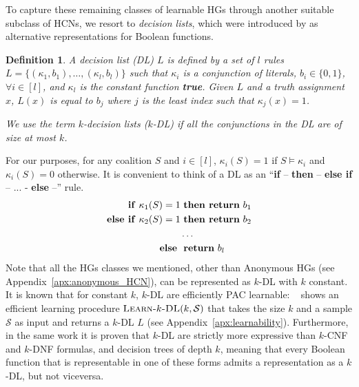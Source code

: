 \documentclass[letterpaper]{article} %
\newtheorem{definition}[theorem]{Definition}
\newcommand{\sample}{\ensuremath{\mathcal{S}}}
\newcommand{\learnkDL}{\textsc{Learn-}k\textsc{-DL}}
\begin{document}
To capture these remaining classes of learnable HGs through another suitable subclass of HCNs, we resort to \emph{decision lists}, which were introduced by \citet{Rivest87} as alternative representations for Boolean functions.
\begin{definition}
A \emph{decision list (DL)} $L$ is defined by a set of $l$ rules $L=\{(\kappa_1, b_1), \ldots, (\kappa_l, b_l)\}$ such that $\kappa_i$ is a conjunction of literals, $b_i \in \{0,1\}$, $\forall i\in [l]$, and $\kappa_l$ is the constant function \textbf{true}. Given $L$ and a truth assignment $x$, $L(x)$ is equal to $b_j$ where $j$ is the least index such that $\kappa_j(x)=1$.

We use the term $k$-decision lists ($k$-DL) if all the conjunctions in the DL are of size at most $k$.
\end{definition}
%
For our purposes, for any coalition $S$ and $i\in [l]$, $\kappa_i(S)=1$ if $S\models \kappa_i$ and $\kappa_i(S)=0$ otherwise. It is convenient to think of a DL as an ``\textbf{if} -- \textbf{then} -- \textbf{else if} -- ... - \textbf{else} --'' rule.
\begin{align*}
    \text{\textbf{if} } \kappa_1(S)=1 &\text{ \textbf{then return} } b_1\\
    \text{\textbf{else if} } \kappa_2(S)=1 &\text{ \textbf{then return} } b_2\\
    &\ldots\\
    \text{\textbf{else} } &\text{ \textbf{return} } b_l
\end{align*}
Note that all the HGs classes we mentioned, other than Anonymous HGs 
(see Appendix~\ref{apx:anonymous_HCN}),
can be represented as $k$-DL with $k$ constant.
%
It is known that for constant $k$, $k$-DL 
are efficiently PAC learnable: ~\citet{Rivest87} shows an efficient learning procedure $\learnkDL(k,\sample)$ that takes the size $k$ and a sample $\sample$ as input and returns a $k$-DL $L$ (see Appendix~\ref{apx:learnability}).
%
Furthermore, in the same work it is proven that $k$-DL are strictly more expressive than $k$-CNF and $k$-DNF formulas, and decision trees of depth $k$, meaning that every Boolean function that is representable in one of these forms admits a representation as a $k$-DL, but not viceversa.
\end{document}
